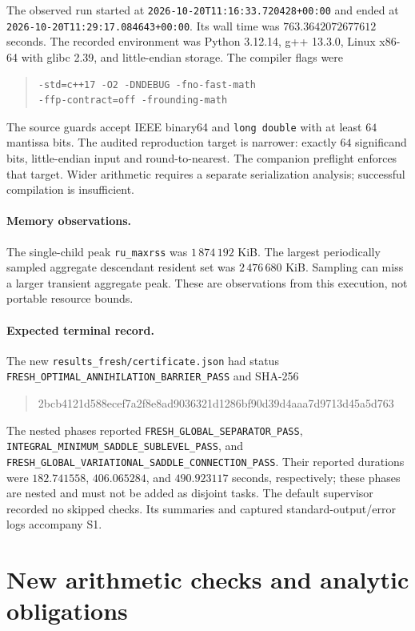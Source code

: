 \documentclass[10pt]{article}
\newcommand{\code}[1]{\nolinkurl{#1}}
\begin{document}
The observed run started at \code{2026-10-20T11:16:33.720428+00:00} and
ended at \code{2026-10-20T11:29:17.084643+00:00}. Its wall time was
$763.3642072677612$ seconds. The recorded environment was Python 3.12.14,
g++ 13.3.0, Linux x86-64 with glibc 2.39, and little-endian storage.
The compiler flags were
\begin{quote}\small
\begin{verbatim}
-std=c++17 -O2 -DNDEBUG -fno-fast-math
-ffp-contract=off -frounding-math
\end{verbatim}
\end{quote}
The source guards accept IEEE binary64 and \code{long double} with at
least $64$ mantissa bits. The audited reproduction target is narrower:
exactly $64$ significand bits, little-endian input and round-to-nearest.
The companion preflight enforces that target. Wider arithmetic requires
a separate serialization analysis; successful compilation is insufficient.

\paragraph{Memory observations.}
The single-child peak \code{ru_maxrss} was $1\,874\,192$ KiB. The largest
periodically sampled aggregate descendant resident set was
$2\,476\,680$ KiB. Sampling can miss a larger transient aggregate peak.
These are observations from this execution, not portable resource bounds.

\paragraph{Expected terminal record.}
The new \code{results_fresh/certificate.json} had status
\code{FRESH_OPTIMAL_ANNIHILATION_BARRIER_PASS} and SHA-256
\begin{quote}\small\ttfamily
2bcb4121d588ecef7a2f8e8ad9036321d1286bf90d39d4aaa7d9713d45a5d763
\end{quote}
The nested phases reported \code{FRESH_GLOBAL_SEPARATOR_PASS},
\code{INTEGRAL_MINIMUM_SADDLE_SUBLEVEL_PASS}, and
\code{FRESH_GLOBAL_VARIATIONAL_SADDLE_CONNECTION_PASS}. Their reported
durations were $182.741558$, $406.065284$, and $490.923117$ seconds,
respectively; these phases are nested and must not be added as disjoint
tasks. The default supervisor recorded no skipped checks. Its summaries
and captured standard-output/error logs accompany S1.

\clearpage
\section{New arithmetic checks and analytic obligations}
\end{document}
